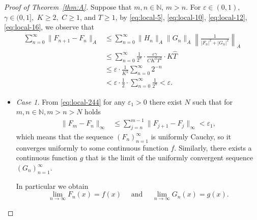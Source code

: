 \documentclass[12pt,fleqn]{amsart}
\theoremstyle{definition}
\numberwithin{equation}{section}
\theoremstyle{remark}
\newcommand{\e}{\varepsilon}
\begin{document}
\begin{proof}[Proof of Theorem~\ref{thm:A}]
Suppose that $m,n \in \mathbb{N}$, $m>n.$ For
$\e \in(0,1),$  $\gamma \in(0,1],$ $ K \geqslant 2,$ $C\geqslant 1$, and $T\geqslant 1$,
by 
\eqref{eq:local-5}, \eqref{eq:local-10}, \eqref{eq:local-12},
\eqref{eq:local-16}, we observe that
%
\begin{equation}\label{eq:local-244}
    \begin{split} 
        \sum_{n=0}^{\infty} \|F_{n+1}-F_n\|_{A}&\leqslant  
        \sum_{n=0}^\infty 
        \|H_n\|_{A}
        \|G_n\|_{A}
        \left\|\frac{1}{|F_n|^2+|G_n|^2}\right\|_{A}\\
        &\leqslant 
        \sum_{n=0}^\infty \frac{1}{2^n}\cdot\frac{\e\gamma}{CK^3T^2}
        \cdot K\widehat{T} \\
        & \leqslant 
        \e \cdot \frac{1}{K^2}\sum_{n=0}^\infty 2^{-n}\\
        &<
        \e \cdot \frac{1}{2}\cdot \sum_{n=0}^\infty \frac{1}{2^n} < \e.
    \end{split}
\end{equation}
%
\begin{itemize}
\item[] \emph{Case 1.}
From \eqref{eq:local-244} for any $\varepsilon_{1}>0$ there exist $N$ such that for $m,n \in \mathbb{N}, m>n>N$ holds
%
\begin{equation}\label{eq:local-2444}
    \begin{split}
        \|F_m - F_n\|_{\infty}
        &\leqslant  
        \sum_{j=n}^{m-1} \|F_{j+1}-F_j\|_{\infty}< \varepsilon_1,
    \end{split}
\end{equation}
%
which means that the sequence $(F_n)_{n=1}^\infty$ is uniformly Cauchy, so it converges uniformly to some continuous function $f$. Similarly, there exists a continuous function $g$ that is the limit of the uniformly convergent sequence $(G_n)_{n=1}^{\infty}$.\smallskip

In particular we obtain
\begin{equation}\label{point}
    \lim_{n\rightarrow \infty} F_n(x) = f(x) \quad \text{ and } \quad \lim_{n\rightarrow \infty} G_n(x) = g(x).
\end{equation}


\end{itemize}
\end{proof}
\end{document}
